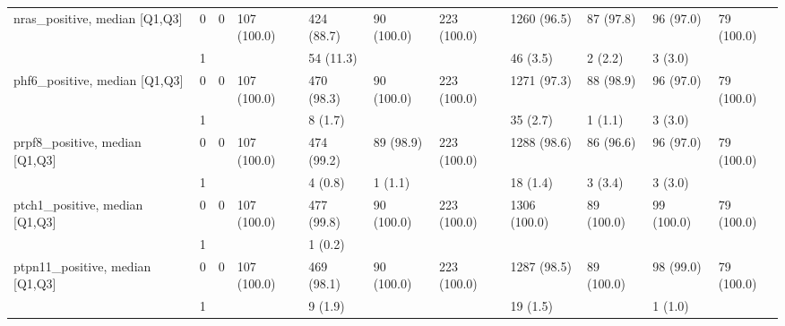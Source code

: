 \begin{tabular}{lllllllllll}
nras\_positive, median [Q1,Q3] & 0 &                    0 &         107 (100.0) &         424 (88.7) &           90 (100.0) &         223 (100.0) &       1260 (96.5) &         87 (97.8) &           96 (97.0) &           79 (100.0) \\
                 & 1 &                      &                     &          54 (11.3) &                      &                     &          46 (3.5) &           2 (2.2) &             3 (3.0) &                      \\
phf6\_positive, median [Q1,Q3] & 0 &                    0 &         107 (100.0) &         470 (98.3) &           90 (100.0) &         223 (100.0) &       1271 (97.3) &         88 (98.9) &           96 (97.0) &           79 (100.0) \\
                 & 1 &                      &                     &            8 (1.7) &                      &                     &          35 (2.7) &           1 (1.1) &             3 (3.0) &                      \\
prpf8\_positive, median [Q1,Q3] & 0 &                    0 &         107 (100.0) &         474 (99.2) &            89 (98.9) &         223 (100.0) &       1288 (98.6) &         86 (96.6) &           96 (97.0) &           79 (100.0) \\
                 & 1 &                      &                     &            4 (0.8) &              1 (1.1) &                     &          18 (1.4) &           3 (3.4) &             3 (3.0) &                      \\
ptch1\_positive, median [Q1,Q3] & 0 &                    0 &         107 (100.0) &         477 (99.8) &           90 (100.0) &         223 (100.0) &      1306 (100.0) &        89 (100.0) &          99 (100.0) &           79 (100.0) \\
                 & 1 &                      &                     &            1 (0.2) &                      &                     &                   &                   &                     &                      \\
ptpn11\_positive, median [Q1,Q3] & 0 &                    0 &         107 (100.0) &         469 (98.1) &           90 (100.0) &         223 (100.0) &       1287 (98.5) &        89 (100.0) &           98 (99.0) &           79 (100.0) \\
                 & 1 &                      &                     &            9 (1.9) &                      &                     &          19 (1.5) &                   &             1 (1.0) &                      \\

\end{tabular}
